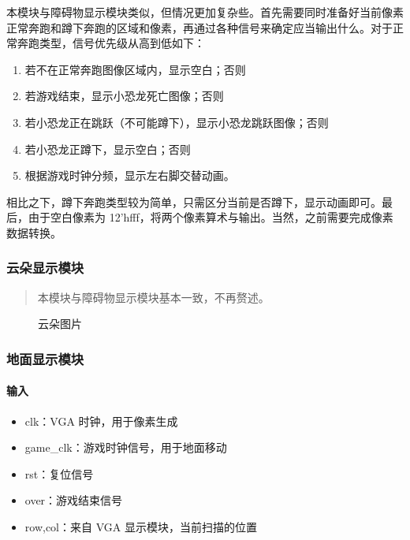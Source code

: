 \documentclass[hyperref,UTF8,12pt,a4paper]{ctexart}
\providecommand{\tightlist}{%
  \setlength{\itemsep}{0pt}\setlength{\parskip}{0pt}}
\begin{document}
本模块与障碍物显示模块类似，但情况更加复杂些。首先需要同时准备好当前像素正常奔跑和蹲下奔跑的区域和像素，再通过各种信号来确定应当输出什么。对于正常奔跑类型，信号优先级从高到低如下：

\begin{enumerate}
\def\labelenumi{\arabic{enumi}.}
\tightlist
\item
  若不在正常奔跑图像区域内，显示空白；否则
\item
  若游戏结束，显示小恐龙死亡图像；否则
\item
  若小恐龙正在跳跃（不可能蹲下），显示小恐龙跳跃图像；否则
\item
  若小恐龙正蹲下，显示空白；否则
\item
  根据游戏时钟分频，显示左右脚交替动画。
\end{enumerate}

相比之下，蹲下奔跑类型较为简单，只需区分当前是否蹲下，显示动画即可。最后，由于空白像素为
12'hfff，将两个像素算术与输出。当然，之前需要完成像素数据转换。

\hypertarget{ux4e91ux6735ux663eux793aux6a21ux5757}{%
\subsubsection{云朵显示模块}\label{ux4e91ux6735ux663eux793aux6a21ux5757}}

\begin{quote}
本模块与障碍物显示模块基本一致，不再赘述。
\end{quote}

\begin{figure}[H]
\centering
{}
\caption{云朵图片}
\end{figure}

\hypertarget{ux5730ux9762ux663eux793aux6a21ux5757}{%
\subsubsection{地面显示模块}\label{ux5730ux9762ux663eux793aux6a21ux5757}}

\hypertarget{ux8f93ux5165-6}{%
\paragraph{输入}\label{ux8f93ux5165-6}}

\begin{itemize}
\tightlist
\item
  clk：VGA 时钟，用于像素生成
\item
  game\_clk：游戏时钟信号，用于地面移动
\item
  rst：复位信号
\item
  over：游戏结束信号
\item
  row,col：来自 VGA 显示模块，当前扫描的位置
\end{itemize}
\end{document}
